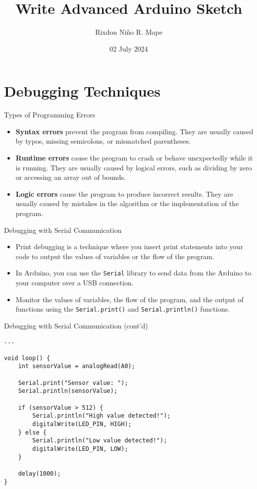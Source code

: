 \documentclass[sectionframe]{oxblue-beamer}
\title{Write Advanced Arduino Sketch}
\author[Mape, R. N. R.]{Rixdon Niño R. Mape}
\institute{
    College of Science \\
    Computer Science and Information Technology Department \\
    Bicol University
}
\date{02 July 2024}
\begin{document}
\begin{frame}
\titlepage
\end{frame}

\section{Debugging Techniques}

\begin{frame}{Types of Programming Errors}
\begin{itemize}
    \item \textbf{Syntax errors} prevent the program from compiling. They are usually caused by typos, missing semicolons, or mismatched parentheses.
    \item \textbf{Runtime errors} cause the program to crash or behave unexpectedly while it is running. They are usually caused by logical errors, such as dividing by zero or accessing an array out of bounds.
    \item \textbf{Logic errors} cause the program to produce incorrect results. They are usually caused by mistakes in the algorithm or the implementation of the program.
\end{itemize}
\end{frame}

\begin{frame}{Debugging with Serial Communication}
\begin{itemize}
    \item Print debugging is a technique where you insert print statements into your code to output the values of variables or the flow of the program.
    \item In Arduino, you can use the \texttt{Serial} library to send data from the Arduino to your computer over a USB connection.
    \item Monitor the values of variables, the flow of the program, and the output of functions using the \texttt{Serial.print()} and \texttt{Serial.println()} functions.
\end{itemize}
\end{frame}

\begin{frame}[fragile]{Debugging with Serial Communication (cont'd)}
\begin{verbatim}
...

void loop() {
    int sensorValue = analogRead(A0);

    Serial.print("Sensor value: ");
    Serial.println(sensorValue);

    if (sensorValue > 512) {
        Serial.println("High value detected!");
        digitalWrite(LED_PIN, HIGH);
    } else {
        Serial.println("Low value detected!");
        digitalWrite(LED_PIN, LOW);
    }

    delay(1000);
}
\end{verbatim}
\end{frame}
\end{document}
